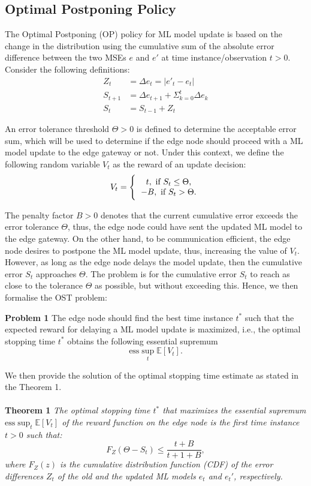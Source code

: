 \documentclass{mpaper}
\begin{document}
\subsection{Optimal Postponing Policy}
The Optimal Postponing (OP) policy for ML model update is based on the change in the distribution using the cumulative sum of the absolute error difference between the two MSEs $e$ and $e'$ at time instance/observation $t>0$. Consider the following definitions:
\begin{align}
    Z_t &= \Delta e_t = | e'_t - e_t |\\
    S_{t+1} &= \Delta e_{t+1} + \Sigma_{k=0}^t \Delta e_k\\
    S_t &= S_{t-1} + Z_t\label{eq:1}
\end{align}

An error tolerance threshold $\Theta > 0$ is defined to determine the acceptable error sum, which will be used to determine if the 
edge node should proceed with a ML model update to the edge gateway or not. Under this context, we define the following random variable $V_{t}$ as the reward of an update decision:
\begin{equation}\label{reward}
    V_t = \Bigg\{ \begin{tabular}{c}
                  $t,\ \text{if}\ S_t \leq \Theta$, \\
                  $-B,\ \text{if}\ S_t > \Theta.$
                  \end{tabular}
\end{equation}

The penalty factor $B> 0$ denotes that the current cumulative error exceeds the error tolerance $\Theta$, thus, the edge node could have sent the updated ML model to the edge gateway. On the other hand, to be communication efficient, the edge node desires to postpone the ML model update, thus, increasing the value of $V_{t}$. However, as long as the edge node delays the model update, then the cumulative error $S_{t}$ approaches $\Theta$. The problem is for the cumulative error $S_{t}$ to reach as close to the tolerance $\Theta$ as possible, but without exceeding this. Hence, we then formalise the OST problem:

\textbf{Problem 1} The edge node should find the best time instance $t^{*}$ such that the expected reward for delaying a ML model update is maximized, i.e., the optimal stopping time $t^{*}$ obtains the following essential supremum
\[
\mbox{ess} \sup_{t} \mathbb{E}[V_{t}].
\]

We then provide the solution of the optimal stopping time estimate as stated in the Theorem 1.
\\
\\
\textbf{Theorem 1}\textit{
The optimal stopping time $t^{*}$ that maximizes the essential supremum $\mbox{ess} \sup_{t} \mathbb{E}[V_{t}]$ of the reward function on the edge node is the first time instance $t>0$ such that:
\[
F_{Z}(\Theta - S_{t}) \leq \frac{t+B}{t+1+B},
\]
where $F_{Z}(z)$ is the cumulative distribution function (CDF) of the error differences $Z_{t}$ of the old and the updated ML models $e_{t}$ and $e_{t}'$, respectively.}  
\\
\end{document}
